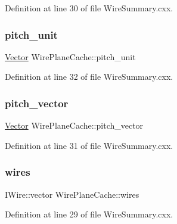 Definition at line 30 of file Wire\+Summary.\+cxx.

\mbox{\label{struct_wire_plane_cache_ab5d3c487f11c3ab90849c5f466c7e2d1}} 
\subsubsection{\texorpdfstring{pitch\+\_\+unit}{pitch\_unit}}
{\footnotesize\ttfamily \hyperlink{namespace_wire_cell_aa3c82d3ba85f032b0d278b7004846800}{Vector} Wire\+Plane\+Cache\+::pitch\+\_\+unit}



Definition at line 32 of file Wire\+Summary.\+cxx.

\mbox{\label{struct_wire_plane_cache_af3323239ead8e9019b19e256010fd5cb}} 
\subsubsection{\texorpdfstring{pitch\+\_\+vector}{pitch\_vector}}
{\footnotesize\ttfamily \hyperlink{namespace_wire_cell_aa3c82d3ba85f032b0d278b7004846800}{Vector} Wire\+Plane\+Cache\+::pitch\+\_\+vector}



Definition at line 31 of file Wire\+Summary.\+cxx.

\mbox{\label{struct_wire_plane_cache_affdcab3668294595f76099223c013600}} 
\subsubsection{\texorpdfstring{wires}{wires}}
{\footnotesize\ttfamily I\+Wire\+::vector Wire\+Plane\+Cache\+::wires}



Definition at line 29 of file Wire\+Summary.\+cxx.

\mbox{\label{struct_wire_plane_cache_a253233f47cbf5ece1ba3ece1a211b8c4}} 

